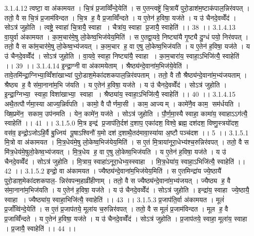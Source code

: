 3.1.4.12
त्वष्टा॒ वा अ॑कामयत । चि॒त्रं प्र॒जाव्विँ॑न्दे॒येति॑ । स ए॒तन्त्वष्ट्रे॑ चि॒त्रायै॑ पुरो॒डाश॑म॒ष्टाक॑पाल॒न्निर॑वपत् । ततो॒ वै स चि॒त्रं प्र॒जाम॑विन्दत । चि॒त्र ह॒ वै प्र॒जाव्विँ॑न्दते । य ए॒तेन॑ ह॒विषा॒ यज॑ते । य उ॑ चैनदे॒वव्वेँद॑ । सोऽत्र॑ जुहोति । त्वष्ट्रे॒ स्वाहा॑ चि॒त्रायै॒ स्वाहा । चैत्रा॑य॒ स्वाहा प्र॒जायै॒ स्वाहेति॑ ।। 38 ।।
3.1.4.13
वा॒युर्वा अ॑कामयत । का॒म॒चार॑मे॒षु लो॒केष्व॒भिज॑येय॒मिति॑ । स ए॒तद्वा॒यवे॒ निष्ट्या॑यै गृ॒ष्ट्यै दु॒ग्धं पयो॒ निर॑वपत् । ततो॒ वै स का॑म॒चार॑मे॒षु लो॒केष्व॒भ्य॑जयत् । का॒म॒चार॑ ह॒ वा ए॒षु लो॒केष्व॒भिज॑यति । य ए॒तेन॑ ह॒विषा॒ यज॑ते । य उ॑ चैनदे॒वव्वेँद॑ । सोऽत्र॑ जुहोति । वा॒यवे॒ स्वाहा॒ निष्ट्या॑यै॒ स्वाहा । का॒म॒चारा॑य॒ स्वाहा॒ऽभिजि॑त्यै॒ स्वाहेति॑ ।। 39 ।।
3.1.4.14
इ॒न्द्रा॒ग्नी वा अ॑कामयेताम् । श्रैष्ठ्य॑न्दे॒वाना॑म॒भिज॑ये॒वेति॑ । तावे॒तमि॑न्द्रा॒ग्निभ्या॒व्विँशा॑खाभ्यां पुरो॒डाश॒मेका॑दशकपाल॒न्निर॑वपताम् । ततो॒ वै तौ श्रैष्ठ्य॑न्दे॒वाना॑म॒भ्य॑जयताम् । श्रैष्ठ्य॑ ह॒ वै स॑मा॒नाना॑म॒भि ज॑यति । य ए॒तेन॑ ह॒विषा॒ यज॑ते । य उ॑ चैनदे॒वव्वेँद॑ । सोऽत्र॑ जुहोति । इ॒न्द्रा॒ग्निभ्या॒॒ स्वाहा॒ विशा॑खाभ्या॒॒ स्वाहा । श्रैष्ठ्या॑य॒ स्वाहा॒ऽभिजि॑त्यै॒ स्वाहेति॑ ।। 40 ।।
3.1.4.15
अथै॒तत्पौर्णमा॒स्या आज्य॒न्निर्व॑पति । कामो॒ वै पौर्णमा॒सी । काम॒ आज्यम् । कामे॑नै॒व काम॒॒ सम॑र्धयति । ख्षि॒प्रमे॑न॒॒ सकाम॒ उप॑नमति । येन॒ कामे॑न॒ यज॑ते । सोऽत्र॑ जुहोति । पौ॒र्ण॒मा॒स्यै स्वाहा॒ कामा॑य॒ स्वाहाऽऽग॑त्यै॒ स्वाहेति॑ ।। 41 ।।
3.1.5.0
मि॒त्र इन्द्र॑ प्र॒जाप॑ति॒र्दश॑ द॒शाप॒ एका॑दश॒ विश्वे॒ ब्रह्म॒ दश॑दश॒ विष्णु॒स्त्रयो॑दश॒ वस॑व॒ इन्द्रो॒ऽजोऽहि॒र्वै बु॒ध्निय॑ पू॒षाऽश्विनौ॑ य॒मो दश॑ द॒शाथै॒तद॑मावा॒स्या॑या अ॒ष्टौ पञ्च॑दश ।। 5 ।।
3.1.5.1
मि॒त्रो वा अ॑कामयत । मि॒त्र॒धेय॑मे॒षु लो॒केष्व॒भिज॑येय॒मिति॑ । स ए॒तं मि॒त्राया॑नूरा॒धेभ्य॑श्च॒रुन्निर॑वपत् । ततो॒ वै स मि॑त्र॒धेय॑मे॒षुलो॒केष्व॒भ्य॑जयत् । मि॒त्र॒धेय॑ ह॒ वा ए॒षु लो॒केष्व॒भिज॑यति । य ए॒तेन॑ ह॒विषा॒ यज॑ते । य उ॑ चैनदे॒वव्वेँद॑ । सोऽत्र॑ जुहोति । मि॒त्राय॒ स्वाहा॑ऽनूरा॒धेभ्य॒स्स्वाहा । मि॒त्र॒धेया॑य॒ स्वाहा॒ऽभिजि॑त्यै॒ स्वाहेति॑ ।। 42 ।।
3.1.5.2
इन्द्रो॒ वा अ॑कामयत । ज्यैष्ठ्य॑न्दे॒वाना॑म॒भिज॑येय॒मिति॑ । स ए॒तमिन्द्रा॑य ज्ये॒ष्ठायै॑ पुरो॒डाश॒मेका॑दशकपाल॒- न्निर॑वपन्म॒हाव्री॑हीणाम् । ततो॒ वै स ज्यैष्ठ्य॑न्दे॒वाना॑म॒भ्य॑जयत् । ज्यैष्ठ्य॑ ह॒ वै स॑मा॒नाना॑म॒भिज॑यति । य ए॒तेन॑ ह॒विषा॒ यज॑ते । य उ॑ चैनदे॒वव्वेँद॑ । सोऽत्र॑ जुहोति । इन्द्रा॑य॒ स्वाहा ज्ये॒ष्ठायै॒ स्वाहा । ज्यैष्ठ्या॑य॒ स्वाहा॒भिजि॑त्यै॒ स्वाहेति॑ ।। 43 ।।
3.1.5.3
प्र॒जाप॑ति॒र्वा अ॑कामयत । मूलं॑ प्र॒जाँव्वि॑न्दे॒येति॑ । स ए॒तं प्र॒जाप॑तये॒ मूला॑य च॒रुन्निर॑वपत् । ततो॒ वै स मूलं॑ प्र॒जाम॑विन्दत । मूल॑ ह॒ वै प्र॒जाव्विँ॑न्दते । य ए॒तेन॑ ह॒विषा॒ यज॑ते । य उ॑ चैनदे॒वव्वेँद॑ । सोऽत्र॑ जुहोति । प्र॒जाप॑तये॒ स्वाहा॒ मूला॑य॒ स्वाहा । प्र॒जायै॒ स्वाहेति॑ ।। 44 ।।

